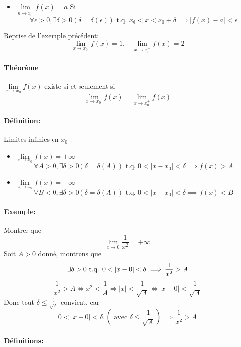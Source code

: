 \documentclass[
    11pt,
    a4paper,
    oneside,
    headinlcude, footinclude,
    twoside,
]{report}
\newcommand{\tq}[0]{\textrm{ t.q. }}
\begin{document}
\begin{enumerate}
\begin{itemize}
\item $\lim\limits_{n \to x_{0}^{+}} f (x) = a $ Si 
$$\forall \epsilon > 0, \exists \delta > 0 (\delta = \delta(\epsilon))
\tq x_{0} < x < x_{0} + \delta \implies |f(x) - a| < \epsilon$$
\end{itemize}

Reprise de l'exemple précédent:
$$ \lim_{x \to x_{0}^{-}} f(x) = 1, \quad \lim_{x \to x_{0}^{+}} f(x)
= 2$$

\paragraph{Théorème}

$\lim\limits_{x \to x_{0}} f(x)$ existe si et seulement si 
$$ \lim_{x \to x_{0}^{-}} f(x) = \lim_{x \to x_{0}^{+}} f(x)$$
\end{enumerate}

\paragraph{Définition:}

Limites  infinies en $x_{0}$ 

\begin{itemize}
\item $\lim\limits_{x \to x_{0}} f(x) = + \infty$
$$\forall A > 0, \exists \delta > 0 (\delta = \delta(A)) \tq 0 < |x -
x_{0} | < \delta \implies f(x) > A$$
\item $\lim\limits_{x \to x_{0}} f(x) = - \infty$
$$\forall B < 0, \exists \delta > 0 (\delta = \delta(A)) \tq 0 < |x -
x_{0} | < \delta \implies f(x) < B$$
\end{itemize}


\paragraph{Exemple:}

Montrer que $$ \lim_{x \to 0} \frac{1}{x^{2}} = + \infty$$
Soit $A > 0$ donné, montrons que 
$$ \exists \delta > 0 \tq 0 < | x - 0| < \delta \implies \frac{1}{x^{2}} > A\\ $$
$$ \frac{1}{x^{2}} > A \iff x^{2} < \frac{1}{A} \iff |x| < \frac{1}{\sqrt{A}}
\iff | x - 0 | < \frac{1}{\sqrt{A}} $$
Donc tout $\delta \leq \frac{1}{\sqrt{A}}$ convient, car $$0 < | x - 0| <
\delta, (\text{ avec } \delta \leq \frac{1}{\sqrt{A}}) \implies \frac{1}{x^{2}}
> A$$

\paragraph{Définitions:}
\end{document}
